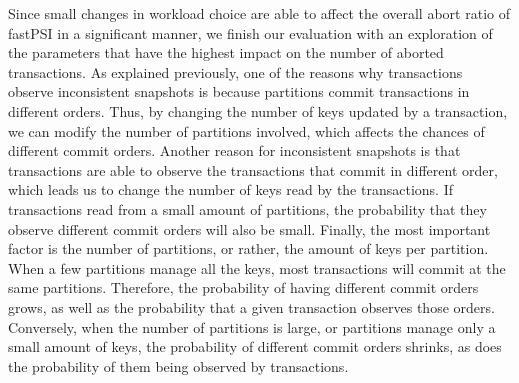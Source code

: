 Since small changes in workload choice are able to affect the overall abort ratio of fastPSI in a significant manner, we finish our evaluation with an exploration of the parameters that have the highest impact on the number of aborted transactions. As explained previously, one of the reasons why transactions observe inconsistent snapshots is because partitions commit transactions in different orders. Thus, by changing the number of keys updated by a transaction, we can modify the number of partitions involved, which affects the chances of different commit orders. Another reason for inconsistent snapshots is that transactions are able to observe the transactions that commit in different order, which leads us to change the number of keys read by the transactions. If transactions read from a small amount of partitions, the probability that they observe different commit orders will also be small. Finally, the most important factor is the number of partitions, or rather, the amount of keys per partition. When a few partitions manage all the keys, most transactions will commit at the same partitions. Therefore, the probability of having different commit orders grows, as well as the probability that a given transaction observes those orders. Conversely, when the number of partitions is large, or partitions manage only a small amount of keys, the probability of different commit orders shrinks, as does the probability of them being observed by transactions.

